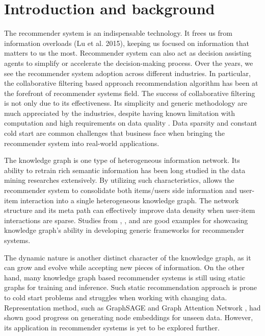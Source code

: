 
\section{Introduction and background}
The recommender system is an indispensable technology. It frees us from information overloads (Lu et al. 2015), keeping us focused on information that matters to us the most. Recommender system can also act as decision assisting agents to simplify or accelerate the decision-making process. Over the years, we see the recommender system adoption across different industries. In particular, the collaborative filtering based approach recommendation algorithm has been at the forefront of recommender systems field. The success of collaborative filtering is not only due to its effectiveness. Its simplicity and generic methodology are much appreciated by the industries, despite having known limitation with computation and high requirements on data quality \citep{Amatriain2016}. Data sparsity and constant cold start are common challenges that business face when bringing the recommender system into real-world applications. 

The knowledge graph is one type of heterogeneous information network. Its ability to retrain rich semantic information has been long studied in the data mining researches \citep{Song2019} extensively. By utilizing such characteristics, allows the recommender system to consolidate both items/users side information and user-item interaction into a single heterogeneous knowledge graph. The network structure and its meta path can effectively improve data density when user-item interactions are sparse. Studies from \citet{qin2020survey}, \citet{wang2018ripplenet}, and \citet{xi2020graph} are good examples for showcasing knowledge graph's ability in developing generic frameworks for recommender systems.

The dynamic nature is another distinct character of the knowledge graph, as it can grow and evolve while accepting new pieces of information.  On the other hand, many knowledge graph based recommender systems is still using static graphs for training and inference. Such static recommendation approach is prone to cold start problems and struggles when working with changing data. Representation method, such as GraphSAGE \citep{hamilton2017inductive} and Graph Attention Network \citep{velivckovic2017graph}, had shown good progress on generating node embeddings for unseen data. However, its application in recommender systems is yet to be explored further.

